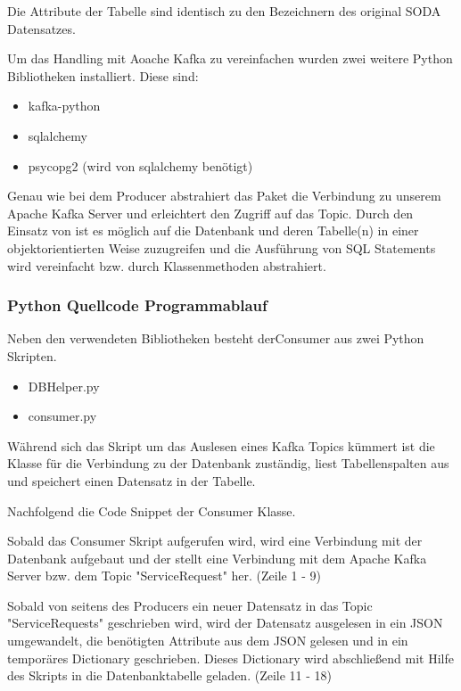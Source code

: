 Die Attribute der Tabelle  sind identisch zu den
Bezeichnern des original \ac{SODA} Datensatzes.

Um das Handling mit Aoache Kafka zu vereinfachen wurden zwei weitere Python
Bibliotheken installiert.
Diese sind:

\begin{itemize}
  \item kafka-python
  \item sqlalchemy
  \item psycopg2 (wird von sqlalchemy benötigt)
\end{itemize}

Genau wie bei dem Producer abstrahiert das Paket  die Verbindung zu unserem Apache Kafka Server und erleichtert den Zugriff auf das Topic.
Durch den Einsatz von  ist es möglich auf die Datenbank und deren Tabelle(n) in einer objektorientierten Weise zuzugreifen
und die Ausführung von \ac{SQL} Statements wird vereinfacht bzw. durch Klassenmethoden abstrahiert.

\subsubsection{Python Quellcode Programmablauf}
\label{subsub:quellcode_storage}
Neben den verwendeten Bibliotheken besteht derConsumer aus zwei Python Skripten.

\begin{itemize}
  \item DBHelper.py
  \item consumer.py
\end{itemize}

Während sich das  Skript um das Auslesen eines Kafka Topics kümmert ist die  Klasse
für die Verbindung zu der Datenbank zuständig, liest Tabellenspalten aus und speichert einen Datensatz in der Tabelle.

Nachfolgend die Code Snippet der Consumer Klasse.



Sobald das Consumer Skript aufgerufen wird, wird eine Verbindung mit der Datenbank
aufgebaut und der  stellt eine Verbindung mit dem Apache Kafka
Server bzw. dem Topic "ServiceRequest" her.
(Zeile 1 - 9)

Sobald von seitens des Producers ein neuer Datensatz in das Topic "ServiceRequests" geschrieben wird,
wird der Datensatz ausgelesen in ein \ac{JSON} umgewandelt, die benötigten Attribute aus dem \ac{JSON} gelesen
und in ein temporäres Dictionary geschrieben.
Dieses Dictionary wird abschließend mit Hilfe des  Skripts in die
Datenbanktabelle geladen.
(Zeile 11 - 18)

